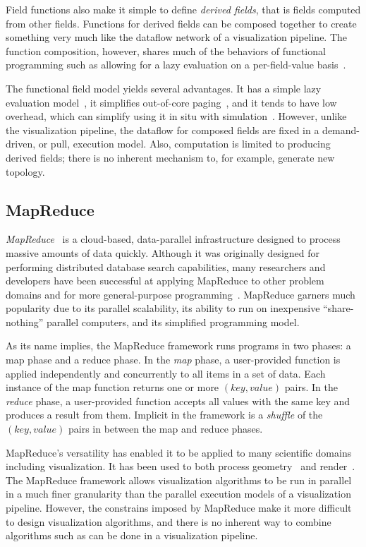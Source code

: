 \documentclass[journal,onecolumn,12pt,letterpaper,twoside]{IEEEtran}
\newcommand*{\lcite}[1]{~\cite{#1}}
\newcommand*{\keyterm}[1]{\emph{#1}}
\begin{document}
Field functions also make it simple to define \keyterm{derived fields},
that is fields computed from other fields.  Functions for derived fields
can be composed together to create something very much like the dataflow
network of a visualization pipeline.  The function composition, however,
shares much of the behaviors of functional programming such as allowing for
a lazy evaluation on a per-field-value basis\lcite{Moran1999}.

The functional field model yields several advantages.  It has a simple lazy
evaluation model\lcite{Moran1999}, it simplifies out-of-core
paging\lcite{Cox1997}, and it tends to have low overhead, which can
simplify using it in situ with simulation\lcite{Ellsworth2006}.  However,
unlike the visualization pipeline, the dataflow for composed fields are
fixed in a demand-driven, or pull, execution model.  Also, computation is
limited to producing derived fields; there is no inherent mechanism to, for
example, generate new topology.

\subsection{MapReduce}
\label{sec:MapReduce}

\keyterm{MapReduce}\lcite{MapReduce} is a cloud-based, data-parallel
infrastructure designed to process massive amounts of data quickly.
Although it was originally designed for performing distributed database
search capabilities, many researchers and developers have been successful
at applying MapReduce to other problem domains and for more general-purpose
programming\lcite{Olston2008,Isard2009}.  MapReduce garners much popularity
due to its parallel scalability, its ability to run on inexpensive
``share-nothing'' parallel computers, and its simplified programming model.

As its name implies, the MapReduce framework runs programs in two phases: a
map phase and a reduce phase.  In the \keyterm{map} phase, a user-provided
function is applied independently and concurrently to all items in a set of
data.  Each instance of the map function returns one or more $(key, value)$
pairs.  In the \keyterm{reduce} phase, a user-provided function accepts all
values with the same key and produces a result from them.  Implicit in the
framework is a \keyterm{shuffle} of the $(key, value)$ pairs in between the
map and reduce phases.

MapReduce's versatility has enabled it to be applied to many scientific
domains including visualization.  It has been used to both process
geometry\lcite{Vo2011} and render\lcite{Stuart2010,Vo2011}.  The MapReduce
framework allows visualization algorithms to be run in parallel in a much
finer granularity than the parallel execution models of a visualization
pipeline.  However, the constrains imposed by MapReduce make it more
difficult to design visualization algorithms, and there is no inherent way
to combine algorithms such as can be done in a visualization pipeline.
\end{document}
